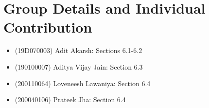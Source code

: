 \documentclass[11pt, twosides]{article}
\begin{document}
\section{Group Details and Individual Contribution}
\begin{itemize}
    \item (19D070003) Adit Akarsh: Sections 6.1-6.2
    \item (190100007) Aditya Vijay Jain:  Section 6.3
    \item (200110064) Loveneesh Lawaniya: Section 6.4 
    \item (200040106) Prateek Jha: Section 6.4
\end{itemize}



\end{document}

